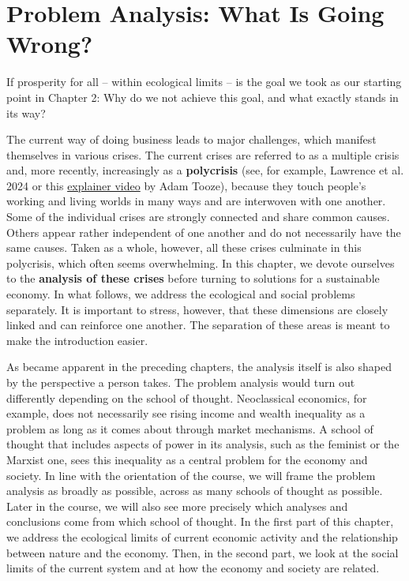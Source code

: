 \documentclass[
  british,
  a4paper,
  DIV=11,
  numbers=noendperiod,
  oneside,
  openany]{scrreprt}
\begin{document}
\chapter{Problem Analysis: What Is Going
Wrong?}\label{problem-analysis-what-is-going-wrong}

\begin{tcolorbox}[enhanced jigsaw, arc=.35mm, bottomrule=.15mm, bottomtitle=1mm, breakable, colback=white, colbacktitle=quarto-callout-note-color!10!white, colframe=quarto-callout-note-color-frame, coltitle=black, left=2mm, leftrule=.75mm, opacityback=0, opacitybacktitle=0.6, rightrule=.15mm, title={Guiding question}, titlerule=0mm, toprule=.15mm, toptitle=1mm]

If prosperity for all -- within ecological limits -- is the goal we took
as our starting point in Chapter 2: Why do we not achieve this goal, and
what exactly stands in its way?

\end{tcolorbox}

The current way of doing business leads to major challenges, which
manifest themselves in various crises. The current crises are referred
to as a multiple crisis and, more recently, increasingly as a
\textbf{polycrisis} (see, for example, Lawrence et al. 2024 or this
\href{https://www.weforum.org/videos/experts-explain-adam-tooze-what-is-the-polycrisis/}{explainer
video} by Adam Tooze), because they touch people's working and living
worlds in many ways and are interwoven with one another. Some of the
individual crises are strongly connected and share common causes. Others
appear rather independent of one another and do not necessarily have the
same causes. Taken as a whole, however, all these crises culminate in
this polycrisis, which often seems overwhelming. In this chapter, we
devote ourselves to the \textbf{analysis of these crises} before turning
to solutions for a sustainable economy. In what follows, we address the
ecological and social problems separately. It is important to stress,
however, that these dimensions are closely linked and can reinforce one
another. The separation of these areas is meant to make the introduction
easier.

As became apparent in the preceding chapters, the analysis itself is
also shaped by the perspective a person takes. The problem analysis
would turn out differently depending on the school of thought.
Neoclassical economics, for example, does not necessarily see rising
income and wealth inequality as a problem as long as it comes about
through market mechanisms. A school of thought that includes aspects of
power in its analysis, such as the feminist or the Marxist one, sees
this inequality as a central problem for the economy and society. In
line with the orientation of the course, we will frame the problem
analysis as broadly as possible, across as many schools of thought as
possible. Later in the course, we will also see more precisely which
analyses and conclusions come from which school of thought. In the first
part of this chapter, we address the ecological limits of current
economic activity and the relationship between nature and the economy.
Then, in the second part, we look at the social limits of the current
system and at how the economy and society are related.
\end{document}
